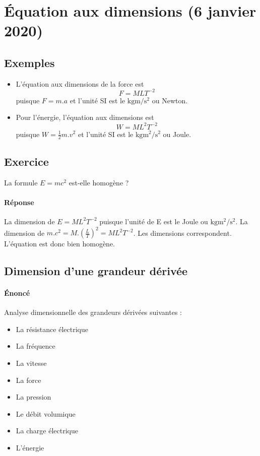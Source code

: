 \documentclass{article}
\begin{document}
\newpage
\section{Équation aux dimensions (6 janvier 2020)}
\subsection{Exemples}
\begin{itemize}
    \item L'équation aux dimensions de la force est
          \begin{equation*}
              F = MLT^{-2}
          \end{equation*}
          puisque $F = m.a$ et l'unité SI est le $\si{\kilogram \meter \per \square \second}$ ou Newton.
    \item Pour l'énergie, l'équation aux dimensions est
          \begin{equation*}
              W = ML^2T^{-2}
          \end{equation*}
          puisque $ W = \frac{1}{2}m.v^2$ et l'unité SI est le $\si{\kilogram \square \meter \per \square \second}$ ou Joule.
\end{itemize}

\subsection{Exercice}
La formule $E = mc^2$ est-elle homogène ?

\paragraph{Réponse}
La dimension de $E = ML^2T^{-2}$ puisque l'unité de E est le Joule ou $\si{\kilogram \square \meter \per \square \second}$. La dimension de $m.c^2 = M.\left(\frac{L}{T}\right)^2 = ML^2T^{-2}$. Les dimensions correspondent. L'équation est donc bien homogène.

\subsection{Dimension d'une grandeur dérivée}
\paragraph{Énoncé}
Analyse dimensionnelle des grandeurs dérivées suivantes :
\begin{itemize}
    \item La résistance électrique
    \item La fréquence
    \item La vitesse
    \item La force
    \item La pression
    \item Le débit volumique
    \item La charge électrique
    \item L'énergie
\end{itemize}
\end{document}
